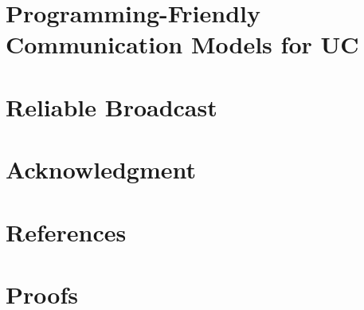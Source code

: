 \documentclass[conference]{IEEEtran}
\begin{document}
%

\section{Programming-Friendly Communication Models for UC} \label{sec:wrappers}


\section{Reliable Broadcast} \label{sec:rbc}


\section*{Acknowledgment}

\section*{References}



\appendix

\section{Proofs}


%

\pagebreak

\begin{figure}

\end{figure}

%

\begin{figure}

\end{figure}

\begin{figure}

\end{figure}

\begin{figure}
\begin{subfigure}{\columnwidth}

\end{subfigure}
%
\begin{subfigure}{\columnwidth}

\end{subfigure}
\end{figure}



\end{document}
